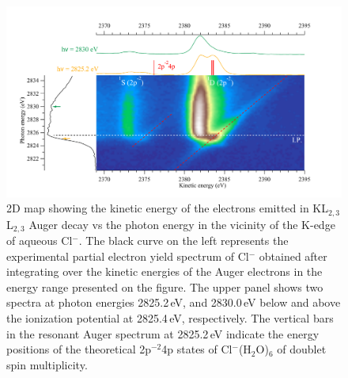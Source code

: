 \begin{figure}[h!]
\centering
\includegraphics[scale=0.55]{figures/cl_2dmap.pdf}
\caption{2D map showing the kinetic energy of the electrons emitted in KL$_{2,3}$L$_{2,3}$ Auger decay vs the photon energy in the vicinity of the K-edge of aqueous Cl$^{-}$. The black curve on the left represents the experimental partial electron yield spectrum of Cl$^{-}$ obtained after integrating over the kinetic energies of the Auger electrons in the energy range presented on the figure. The upper panel shows two spectra at photon energies 2825.2\,eV, and 2830.0\,eV below and above the ionization potential at 2825.4\,eV, respectively. The vertical bars in the resonant Auger spectrum at 2825.2\,eV indicate the energy positions of the theoretical 2p$^{-2}$4p states of Cl$^{-}$(H$_2$O)$_6$ of doublet spin multiplicity.}
\label{fg:2dmap_cl}
\end{figure}


